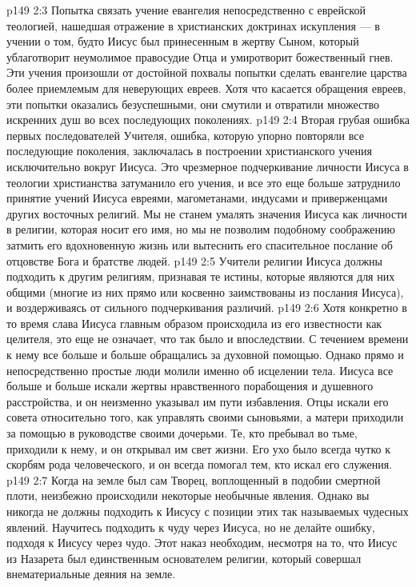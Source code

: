 \vs p149 2:3 \bibnobreakspace Попытка связать учение евангелия непосредственно с еврейской теологией, нашедшая отражение в христианских доктринах искупления --- в учении о том, будто Иисус был принесенным в жертву Сыном, который ублаготворит неумолимое правосудие Отца и умиротворит божественный гнев. Эти учения произошли от достойной похвалы попытки сделать евангелие царства более приемлемым для неверующих евреев. Хотя что касается обращения евреев, эти попытки оказались безуспешными, они смутили и отвратили множество искренних душ во всех последующих поколениях.
\vs p149 2:4 \pc {}\bibnobreakspace Вторая грубая ошибка первых последователей Учителя, ошибка, которую упорно повторяли все последующие поколения, заключалась в построении христианского учения исключительно вокруг  Иисуса. Это чрезмерное подчеркивание личности Иисуса в теологии христианства затуманило его учения, и все это еще больше затруднило принятие учений Иисуса евреями, магометанами, индусами и приверженцами других восточных религий. Мы не станем умалять значения Иисуса как личности в религии, которая носит его имя, но мы не позволим подобному соображению затмить его вдохновенную жизнь или вытеснить его спасительное послание об отцовстве Бога и братстве людей.
\vs p149 2:5 \pc Учители религии Иисуса должны подходить к другим религиям, признавая те истины, которые являются для них общими (многие из них прямо или косвенно заимствованы из послания Иисуса), и воздерживаясь от сильного подчеркивания различий.
\vs p149 2:6 \pc Хотя конкретно в то время слава Иисуса главным образом происходила из его известности как целителя, это еще не означает, что так было и впоследствии. С течением времени к нему все больше и больше обращались за духовной помощью. Однако прямо и непосредственно простые люди молили именно об исцелении тела. Иисуса все больше и больше искали жертвы нравственного порабощения и душевного расстройства, и он неизменно указывал им пути избавления. Отцы искали его совета относительно того, как управлять своими сыновьями, а матери приходили за помощью в руководстве своими дочерьми. Те, кто пребывал во тьме, приходили к нему, и он открывал им свет жизни. Его ухо было всегда чутко к скорбям рода человеческого, и он всегда помогал тем, кто искал его служения.
\vs p149 2:7 Когда на земле был сам Творец, воплощенный в подобии смертной плоти, неизбежно происходили некоторые необычные явления. Однако вы никогда не должны подходить к Иисусу с позиции этих так называемых чудесных явлений. Научитесь подходить к чуду через Иисуса, но не делайте ошибку, подходя к Иисусу через чудо. Этот наказ необходим, несмотря на то, что Иисус из Назарета был единственным основателем религии, который совершал внематериальные деяния на земле.
